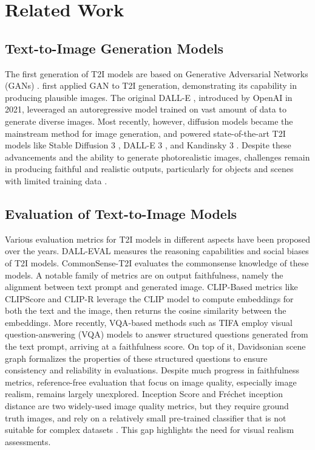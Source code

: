 \section{Related Work}

\subsection{Text-to-Image Generation Models}
The first generation of T2I models are based on Generative Adversarial Networks (GANs) \cite{goodfellow2014generative}. \citet{reed2016generative} first applied GAN to T2I generation, demonstrating its capability in producing plausible images. The original DALL-E \cite{dalle1}, introduced by OpenAI in 2021, leveeraged an autoregressive model trained on vast amount of data to generate diverse images. Most recently, however, diffusion models \cite{ho2020denoising} became the mainstream method for image generation, and powered state-of-the-art T2I models like Stable Diffusion 3 \cite{sd3}, DALL-E 3 \cite{dalle3}, and Kandinsky 3 \cite{kandinsky3}. Despite these advancements and the ability to generate photorealistic images, challenges remain in producing faithful and realistic outputs, particularly for objects and scenes with limited training data \cite{zhang2024text}.

\subsection{Evaluation of Text-to-Image Models}  
Various evaluation metrics for T2I models in different aspects have been proposed over the years. DALL-EVAL \cite{cho2023dall} measures the reasoning capabilities and social biases of T2I models. CommonSense-T2I \cite{fu2024commonsense} evaluates the commonsense knowledge of these models. A notable family of metrics are on output faithfulness, namely the alignment between text prompt and generated image. CLIP-Based metrics like CLIPScore \cite{hessel2021clipscore} and CLIP-R \cite{park2021benchmark} leverage the CLIP model \cite{clip} to compute embeddings for both the text and the image, then returns the cosine similarity between the embeddings. More recently, VQA-based methods such as TIFA \cite{hu2023tifa} employ visual question-answering (VQA) models to answer structured questions generated from the text prompt, arriving at a faithfulness score. On top of it, Davidsonian scene graph \cite{chodavidsonian} formalizes the properties of these structured questions to ensure consistency and reliability in evaluations. Despite much progress in faithfulness metrics, reference-free evaluation that focus on image quality, especially image realism, remains largely unexplored. Inception Score \cite{salimans2016improved} and Fréchet inception distance \cite{heusel2017gans} are two widely-used image quality metrics, but they require ground truth images, and rely on a relatively small pre-trained classifier that is not suitable for complex datasets \cite{frolov2021adversarial}. This gap highlights the need for visual realism assessments.

